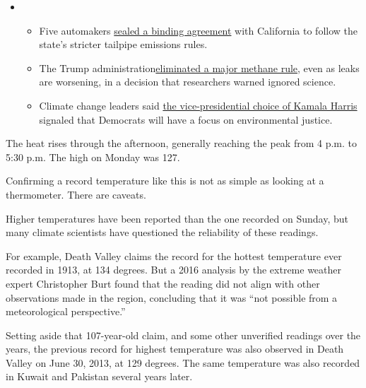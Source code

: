 \begin{itemize}
\item
  \begin{itemize}
  \tightlist
  \item
    Five automakers
    \href{https://www.nytimes3xbfgragh.onion/2020/08/17/climate/california-automakers-pollution.html?action=click\&pgtype=Article\&state=default\&region=MAIN_CONTENT_1\&context=storylines_keepup}{sealed
    a binding agreement} with California to follow the state's stricter
    tailpipe emissions rules.
  \item
    The Trump
    administration\href{https://www.nytimes3xbfgragh.onion/2020/08/13/climate/trump-methane.html?action=click\&pgtype=Article\&state=default\&region=MAIN_CONTENT_1\&context=storylines_keepup}{eliminated
    a major methane rule}, even as leaks are worsening, in a decision
    that researchers warned ignored science.
  \item
    Climate change leaders said
    \href{https://www.nytimes3xbfgragh.onion/2020/08/12/climate/kamala-harris-environmental-justice.html?action=click\&pgtype=Article\&state=default\&region=MAIN_CONTENT_1\&context=storylines_keepup}{the
    vice-presidential choice of Kamala Harris} signaled that Democrats
    will have a focus on environmental justice.
  \end{itemize}
\end{itemize}

The heat rises through the afternoon, generally reaching the peak from 4
p.m. to 5:30 p.m. The high on Monday was 127.

Confirming a record temperature like this is not as simple as looking at
a thermometer. There are caveats.

Higher temperatures have been reported than the one recorded on Sunday,
but many climate scientists have questioned the reliability of these
readings.

For example, Death Valley claims the record for the hottest temperature
ever recorded in 1913, at 134 degrees. But a 2016 analysis by the
extreme weather expert Christopher Burt found that the reading did not
align with other observations made in the region, concluding that it was
``not possible from a meteorological perspective.''

Setting aside that 107-year-old claim, and some other unverified
readings over the years, the previous record for highest temperature was
also observed in Death Valley on June 30, 2013, at 129 degrees. The same
temperature was also recorded in Kuwait and Pakistan several years
later.

